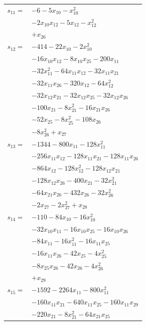 \begin{longtable}{@{}r@{\;}l@{}}
\(s_{11}=\) & \(\displaystyle -6 -5x_{10} -x_{10}^{2}\) \\
 & \(\displaystyle -2x_{10}x_{12} -5x_{12} -x_{12}^{2}\) \\
 & \(\displaystyle +x_{26}\) \\[3pt]
\(s_{12}=\) & \(\displaystyle -414 -22x_{10} -2x_{10}^{2}\) \\
 & \(\displaystyle -16x_{10}x_{12} -8x_{10}x_{25} -200x_{11}\) \\
 & \(\displaystyle -32x_{11}^{2} -64x_{11}x_{12} -32x_{11}x_{21}\) \\
 & \(\displaystyle -32x_{11}x_{26} -320x_{12} -64x_{12}^{2}\) \\
 & \(\displaystyle -32x_{12}x_{21} -32x_{12}x_{25} -32x_{12}x_{26}\) \\
 & \(\displaystyle -100x_{21} -8x_{21}^{2} -16x_{21}x_{26}\) \\
 & \(\displaystyle -52x_{25} -8x_{25}^{2} -108x_{26}\) \\
 & \(\displaystyle -8x_{26}^{2} +x_{27}\) \\[3pt]
\(s_{13}=\) & \(\displaystyle -1344 -800x_{11} -128x_{11}^{2}\) \\
 & \(\displaystyle -256x_{11}x_{12} -128x_{11}x_{21} -128x_{11}x_{26}\) \\
 & \(\displaystyle -864x_{12} -128x_{12}^{2} -128x_{12}x_{21}\) \\
 & \(\displaystyle -128x_{12}x_{26} -400x_{21} -32x_{21}^{2}\) \\
 & \(\displaystyle -64x_{21}x_{26} -432x_{26} -32x_{26}^{2}\) \\
 & \(\displaystyle -2x_{27} -2x_{27}^{2} +x_{28}\) \\[3pt]
\(s_{14}=\) & \(\displaystyle -110 -84x_{10} -16x_{10}^{2}\) \\
 & \(\displaystyle -32x_{10}x_{11} -16x_{10}x_{25} -16x_{10}x_{26}\) \\
 & \(\displaystyle -84x_{11} -16x_{11}^{2} -16x_{11}x_{25}\) \\
 & \(\displaystyle -16x_{11}x_{26} -42x_{25} -4x_{25}^{2}\) \\
 & \(\displaystyle -8x_{25}x_{26} -42x_{26} -4x_{26}^{2}\) \\
 & \(\displaystyle +x_{29}\) \\[3pt]
\(s_{15}=\) & \(\displaystyle -1592 -2264x_{11} -800x_{11}^{2}\) \\
 & \(\displaystyle -160x_{11}x_{21} -640x_{11}x_{25} -160x_{11}x_{29}\) \\
 & \(\displaystyle -220x_{21} -8x_{21}^{2} -64x_{21}x_{25}\) \\

\end{longtable}
